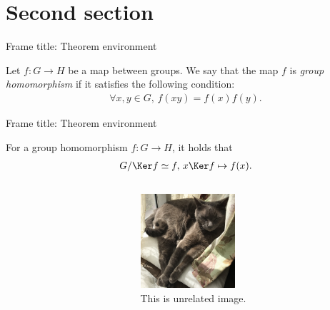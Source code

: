\documentclass[unicode,11pt,aspectratio=169]{beamer}
\begin{document}
\section{Second section}
\begin{frame}{Frame title: Theorem environment}

    \stc{
      \lipsum[2][1-3]
    }

  \begin{defi}
    Let $f: G\to H$ be a map between groups.
    We say that the map $f$ is \textit{group homomorphism}
    if it satisfies the following condition:
    \begin{align}
      \forall x, y\in G, \, f(xy)=f(x)f(y).
    \end{align}
  \end{defi}

\end{frame}
\begin{frame}{Frame title: Theorem environment}
  \begin{thm}
    For a group homomorphism $f: G\to H$, it holds that
    \begin{align}
      G/\Ker f\simeq \Im f, \, x\Ker f\mapsto f(x).
    \end{align}
  \end{thm}

  \vspace{-10pt}
  \begin{columns}[t]

    \begin{column}{0.48\textwidth}
      \stc{
        \lipsum[2][4-8]
      }
    \end{column}

    \begin{column}{0.48\textwidth}
      \begin{figure}[c]
        \centering
        \includegraphics[height=3.5cm]{images/kuu.png}
        \vspace{-0.2cm}
        \caption{This is unrelated image.}
      \end{figure}
    \end{column}

  \end{columns}
\end{frame}
\end{document}
